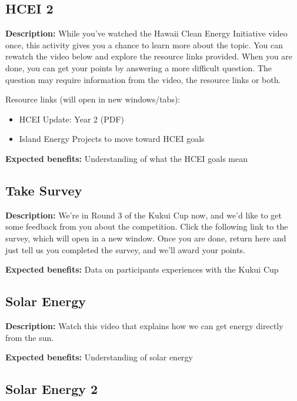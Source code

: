 \subsection{HCEI 2}

\textbf{Description:} While you've watched the Hawaii Clean Energy Initiative video once, this activity gives you a chance to learn more about the topic. You can rewatch the video below and explore the resource links provided. When you are done, you can get your points by answering a more difficult question. The question may require information from the video, the resource links or both.

Resource links (will open in new windows/tabs):

\begin{itemize}
	\item HCEI Update: Year 2 (PDF)
	\item Island Energy Projects to move toward HCEI goals
\end{itemize}

\vspace{2ex}
\textbf{Expected benefits:} Understanding of what the HCEI goals mean


\subsection{Take Survey}

\textbf{Description:} We're in Round 3 of the Kukui Cup now, and we'd like to get some feedback from you about the competition. Click the following link to the survey, which will open in a new window. Once you are done, return here and just tell us you completed the survey, and we'll award your points.

\vspace{2ex}
\textbf{Expected benefits:} Data on participants experiences with the Kukui Cup


\subsection{Solar Energy}

\textbf{Description:} Watch this video that explains how we can get energy directly from the sun.

\vspace{2ex}
\textbf{Expected benefits:} Understanding of solar energy


\subsection{Solar Energy 2}

